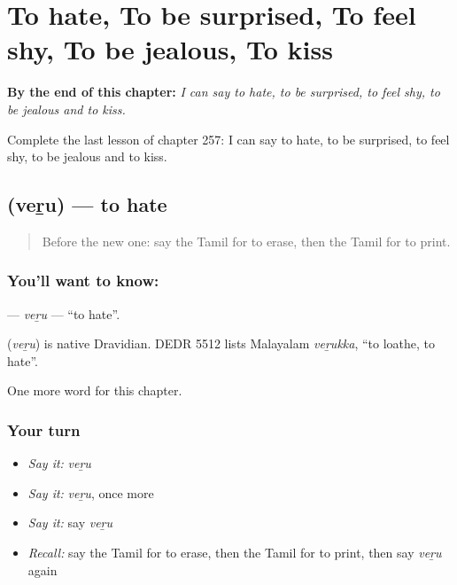 
\chapter{To hate, To be surprised, To feel shy, To be jealous, To kiss}
\label{ch:ta-to-hate-to-be-surprised-to-feel-shy-to-be-jealous-to-kiss}

\begin{chapteropening}
\textbf{By the end of this chapter:} \emph{I can say to hate, to be surprised, to feel shy, to be jealous and to kiss.}

Complete the last lesson of chapter 257: I can say to hate, to be surprised, to feel shy, to be jealous and to kiss.
\end{chapteropening}

\section[\texorpdfstring{\ta{வெறு} (veṟu)}{வெறு (veṟu)}]{ (veṟu) — to hate}

\label{lesson:TA-C257-veru}



\begin{quote}
Before the new one: say the Tamil for to erase, then the Tamil for to print.
\end{quote}

\subsection*{You'll want to know: }
\textbf{} — \emph{veṟu} — \textquotedblleft{}to hate\textquotedblright{}.

\begin{cousinweb}
\textbf{} (\emph{veṟu}) is native Dravidian. DEDR 5512 lists Malayalam \emph{veṟukka}, \textquotedblleft{}to loathe, to hate\textquotedblright{}.
\end{cousinweb}

\begin{grammarlens}[title={What you've built}]
One more word for this chapter.
\end{grammarlens}

\subsection*{Your turn}
\begin{itemize}
\raggedright
  \item \emph{Say it:} \emph{veṟu}
  \item \emph{Say it:} \emph{veṟu}, once more
  \item \emph{Say it:} say \emph{veṟu}
  \item \emph{Recall:} say the Tamil for to erase, then the Tamil for to print, then say \emph{veṟu} again
\end{itemize}

